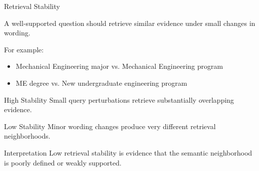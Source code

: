 \documentclass[aspectratio=169]{beamer}
\begin{document}
\begin{frame}{Retrieval Stability}

A well-supported question should retrieve similar evidence under small
changes in wording.

\vspace{0.15cm}

For example:

\begin{itemize}
\item Mechanical Engineering major vs. Mechanical Engineering program
\item ME degree vs. New undergraduate engineering program
\end{itemize}

\vspace{0.15cm}

\begin{block}{High Stability}
Small query perturbations retrieve substantially overlapping evidence.
\end{block}

\begin{block}{Low Stability}
Minor wording changes produce very different retrieval neighborhoods.
\end{block}

\vspace{0.15cm}

\begin{alertblock}{Interpretation}
Low retrieval stability is evidence that the semantic neighborhood is
poorly defined or weakly supported.
\end{alertblock}

\end{frame}

\end{document}
